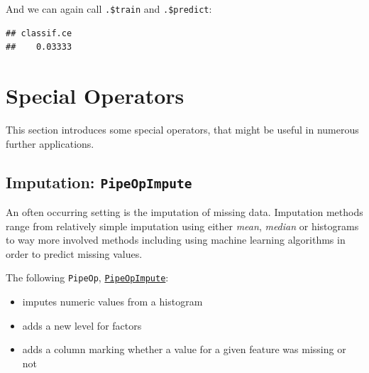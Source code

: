 \documentclass[]{scrbook}
\newenvironment{Shaded}{\begin{snugshade}}{\end{snugshade}}
\newcommand{\KeywordTok}[1]{\textcolor[rgb]{0.13,0.29,0.53}{\textbf{#1}}}
\newcommand{\NormalTok}[1]{#1}
\newcommand{\OperatorTok}[1]{\textcolor[rgb]{0.81,0.36,0.00}{\textbf{#1}}}
\newcommand{\StringTok}[1]{\textcolor[rgb]{0.31,0.60,0.02}{#1}}
\providecommand{\tightlist}{%
  \setlength{\itemsep}{0pt}\setlength{\parskip}{0pt}}
\renewenvironment{Shaded} {\begin{snugshade}\small} {\end{snugshade}}
\begin{document}
And we can again call \texttt{.\$train} and \texttt{.\$predict}:

\begin{Shaded}
\end{Shaded}

\begin{verbatim}
## classif.ce 
##    0.03333
\end{verbatim}

\hypertarget{pipe-special-ops}{%
\section{Special Operators}\label{pipe-special-ops}}

This section introduces some special operators, that might be useful in numerous further applications.

\hypertarget{imputation-pipeopimpute}{%
\subsection{\texorpdfstring{Imputation: \texttt{PipeOpImpute}}{Imputation: PipeOpImpute}}\label{imputation-pipeopimpute}}

An often occurring setting is the imputation of missing data.
Imputation methods range from relatively simple imputation using either \emph{mean}, \emph{median} or histograms to way more involved methods including using machine learning algorithms in order to predict missing values.

The following \texttt{PipeOp}, \href{https://mlr3pipelines.mlr-org.com/reference/PipeOpImpute.html}{\texttt{PipeOpImpute}}:

\begin{itemize}
\tightlist
\item
  imputes numeric values from a histogram
\item
  adds a new level for factors
\item
  adds a column marking whether a value for a given feature was missing or not
\end{itemize}
\end{document}
